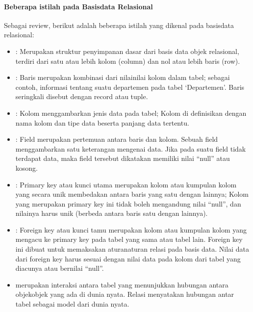 \documentclass[letterpaper,10pt,english]{sphinxmanual}
\begin{document}
\paragraph{Beberapa istilah pada Basisdata Relasional}
\label{\detokenize{sesi2/relationaldb:beberapa-istilah-pada-basisdata-relasional}}
Sebagai review, berikut adalah beberapa istilah yang dikenal pada basisdata relasional:
\begin{itemize}
\item {} 
: Merupakan struktur penyimpanan dasar dari basis data objek relasional, terdiri dari satu atau lebih kolom (column) dan nol atau lebih baris (row).

\item {} 
: Baris merupakan kombinasi dari nilai\sphinxhyphen{}nilai kolom dalam tabel; sebagai contoh, informasi tentang suatu departemen pada tabel ‘Departemen’. Baris seringkali disebut dengan record atau tuple.

\item {} 
: Kolom menggambarkan jenis data pada tabel; Kolom di definisikan dengan nama kolom dan tipe data beserta panjang data tertentu.

\item {} 
: Field merupakan pertemuan antara baris dan kolom. Sebuah field menggambarkan satu keterangan mengenai data. Jika pada suatu field tidak terdapat data, maka field tersebut dikatakan memiliki nilai “null” atau kosong.

\item {} 
: Primary key atau kunci utama merupakan kolom atau kumpulan kolom yang secara unik membedakan antara baris yang satu dengan lainnya; Kolom yang merupakan primary key ini tidak boleh mengandung nilai “null”, dan nilainya harus unik (berbeda antara baris satu dengan lainnya).

\item {} 
: Foreign key atau kunci tamu merupakan kolom atau kumpulan kolom yang mengacu ke primary key pada tabel yang sama atau tabel lain. Foreign key ini dibuat untuk memaksakan aturan\sphinxhyphen{}aturan relasi pada basis data. Nilai data dari foreign key harus sesuai dengan nilai data pada kolom dari tabel yang diacunya atau bernilai “null”.

\item {} 
 merupakan interaksi antara tabel yang menunjukkan hubungan antara objek\sphinxhyphen{}objek yang ada di dunia nyata. Relasi menyatakan hubungan antar tabel sebagai model dari dunia nyata.

\end{itemize}
\end{document}
